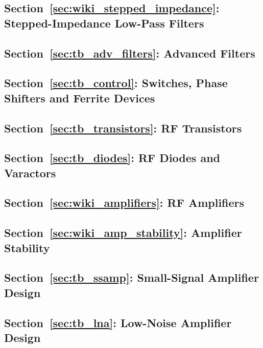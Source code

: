 
\subsection*{Section~\ref{sec:wiki_stepped_impedance}: Stepped-Impedance Low-Pass Filters}

\subsection*{Section~\ref{sec:tb_adv_filters}: Advanced Filters}

\subsection*{Section~\ref{sec:tb_control}: Switches, Phase Shifters and Ferrite Devices}

\subsection*{Section~\ref{sec:tb_transistors}: RF Transistors}

\subsection*{Section~\ref{sec:tb_diodes}: RF Diodes and Varactors}

\subsection*{Section~\ref{sec:wiki_amplifiers}: RF Amplifiers}

\subsection*{Section~\ref{sec:wiki_amp_stability}: Amplifier Stability}

\subsection*{Section~\ref{sec:tb_ssamp}: Small-Signal Amplifier Design}

\subsection*{Section~\ref{sec:tb_lna}: Low-Noise Amplifier Design}
